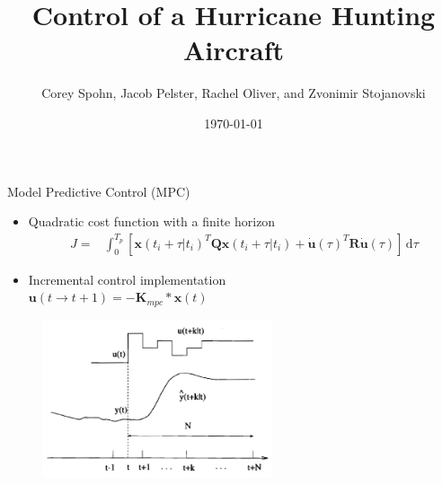 \documentclass[aspectratio=169]{beamer}
\begin{document}

\title[Your Short Title]{Control of a Hurricane Hunting Aircraft}
\author{Corey Spohn, Jacob Pelster, Rachel Oliver, and Zvonimir Stojanovski}
\date{\today}

\begin{frame}
  \titlepage
\end{frame}

\begin{frame}{Model Predictive Control (MPC)}
    \begin{itemize}
        \item Quadratic cost function with a finite horizon
        \begin{eqnarray*}
        J = & \int_0^{T_{p}} \! [\mathbf{x}(t_{i}+\tau|t_{i})^T\mathbf{Q}\mathbf{x}(t_{i}+\tau|t_{i}) +\Dot{\mathbf{u}}(\tau)^T\mathbf{R}\Dot{\mathbf{u}}(\tau)] \, \mathrm{d}\tau 
        \end{eqnarray*}
        \item Incremental control implementation\\
            $ \mathbf{u}(t\rightarrow{t+1}) = -\mathbf{K}_{mpc}*\mathbf{x}(t)$
    \end{itemize}
    \begin{figure}
        \centering
        \includegraphics[width=0.6\textwidth]{MPC_Premise.PNG}
    \end{figure}
\end{frame}
\end{document}
